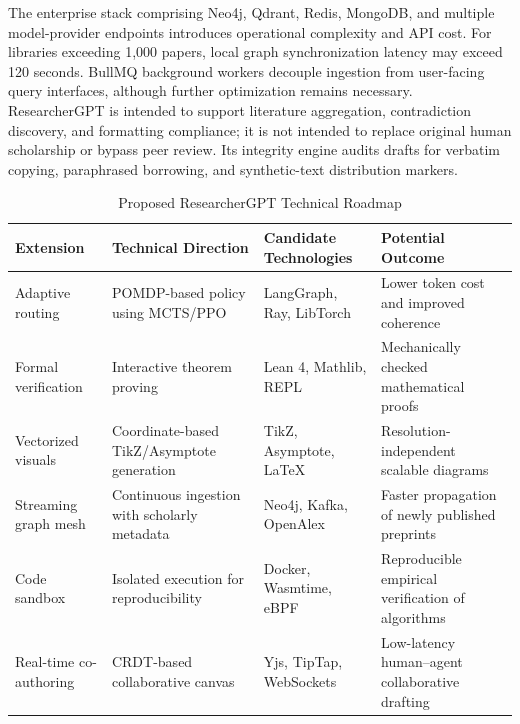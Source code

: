 \documentclass[conference]{IEEEtran}
\begin{document}
The enterprise stack comprising Neo4j, Qdrant, Redis, MongoDB, and multiple model-provider endpoints introduces operational complexity and API cost. For libraries exceeding 1,000 papers, local graph synchronization latency may exceed 120 seconds. BullMQ background workers decouple ingestion from user-facing query interfaces, although further optimization remains necessary. ResearcherGPT is intended to support literature aggregation, contradiction discovery, and formatting compliance; it is not intended to replace original human scholarship or bypass peer review. Its integrity engine audits drafts for verbatim copying, paraphrased borrowing, and synthetic-text distribution markers.

\begin{table}[!t]
\centering
\caption{Proposed ResearcherGPT Technical Roadmap}
\label{tab:roadmap}
\footnotesize
\begin{tabularx}{\textwidth}{@{}l X X X@{}}
\toprule
\textbf{Extension} & \textbf{Technical Direction} & \textbf{Candidate Technologies} & \textbf{Potential Outcome} \\
\midrule
Adaptive routing & POMDP-based policy using MCTS/PPO & LangGraph, Ray, LibTorch & Lower token cost and improved coherence \\
Formal verification & Interactive theorem proving & Lean 4, Mathlib, REPL & Mechanically checked mathematical proofs \\
Vectorized visuals & Coordinate-based TikZ/Asymptote generation & TikZ, Asymptote, \LaTeX & Resolution-independent scalable diagrams \\
Streaming graph mesh & Continuous ingestion with scholarly metadata & Neo4j, Kafka, OpenAlex & Faster propagation of newly published preprints \\
Code sandbox & Isolated execution for reproducibility & Docker, Wasmtime, eBPF & Reproducible empirical verification of algorithms \\
Real-time co-authoring & CRDT-based collaborative canvas & Yjs, TipTap, WebSockets & Low-latency human--agent collaborative drafting \\
\bottomrule
\end{tabularx}
\end{table}
\end{document}
